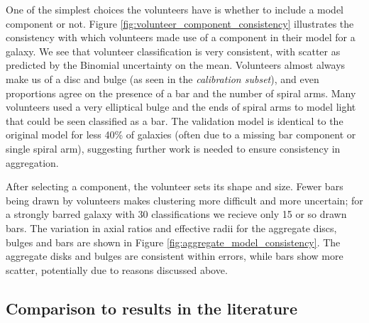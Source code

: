 \documentclass[../main.tex]{subfiles}
\begin{document}
One of the simplest choices the volunteers have is whether to include a model component or not. Figure \ref{fig:volunteer_component_consistency} illustrates the consistency with which volunteers made use of a component in their model for a galaxy. We see that volunteer classification is very consistent, with scatter as predicted by the Binomial uncertainty on the mean. Volunteers almost always make us of a disc and bulge (as seen in the \textit{calibration subset}), and even proportions agree on the presence of a bar and the number of spiral arms. Many volunteers used a very elliptical bulge and the ends of spiral arms to model light that could be seen classified as a bar. The validation model is identical to the original model for less 40\% of galaxies (often due to a missing bar component or single spiral arm), suggesting further work is needed to ensure consistency in aggregation.

\begin{figure*}
  \caption{Comparison of frequency of use of component in volunteer models between the original and validation sets of classifications. Errors shown on the disc, bulge and bar arise from Binomial error estimation.}
  \label{fig:volunteer_component_consistency}
\end{figure*}

After selecting a component, the volunteer sets its shape and size. Fewer bars being drawn by volunteers makes clustering more difficult and more uncertain; for a strongly barred galaxy with 30 classifications we recieve only 15 or so drawn bars. The variation in axial ratios and effective radii for the aggregate discs, bulges and bars are shown in Figure \ref{fig:aggregate_model_consistency}. The aggregate disks and bulges are consistent within errors, while bars show more scatter, potentially due to reasons discussed above.

\begin{figure*}
  \caption{Comparison of component shape in aggregate models between the original and validation sets. Errors are obtained through the sample variance of clustered components, as detailed in Section \ref{sec:error_estimation}.}
  \label{fig:aggregate_model_consistency}
\end{figure*}

\subsection{Comparison to results in the literature}
\end{document}
